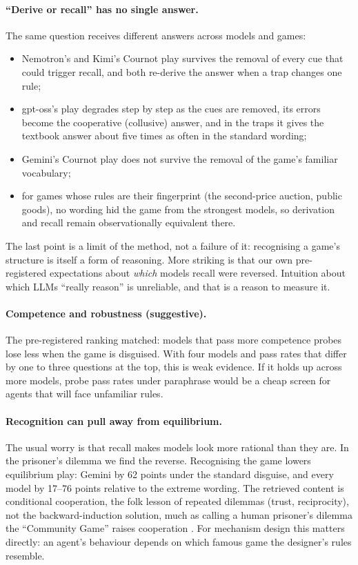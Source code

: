 \documentclass[10pt]{article}
\theoremstyle{definition}
\theoremstyle{remark}
\begin{document}
\paragraph{``Derive or recall'' has no single answer.} The same question receives different
answers across models and games:
\begin{itemize}
\item Nemotron's and Kimi's Cournot play survives the removal of every cue that could trigger
  recall, and both re-derive the answer when a trap changes one rule;
\item gpt-oss's play degrades step by step as the cues are removed, its errors become the
  cooperative (collusive) answer, and in the traps it gives the textbook answer about five
  times as often in the standard wording;
\item Gemini's Cournot play does not survive the removal of the game's familiar vocabulary;
\item for games whose rules are their fingerprint (the second-price auction, public goods), no
  wording hid the game from the strongest models, so derivation and recall remain observationally
  equivalent there.
\end{itemize}
The last point is a limit of the method, not a failure of it: recognising a game's structure is
itself a form of reasoning. More striking is that our own pre-registered expectations
about \emph{which} models recall were reversed. Intuition about which LLMs ``really reason'' is
unreliable, and that is a reason to measure it.

\paragraph{Competence and robustness (suggestive).} The pre-registered ranking matched: models
that pass more competence probes lose less when the game is disguised. With four models and pass
rates that differ by one to three questions at the top, this is weak evidence. If it holds up
across more models, probe pass rates under paraphrase would be a cheap screen for agents that will
face unfamiliar rules.

\paragraph{Recognition can pull away from equilibrium.} The usual worry is that recall makes
models look more rational than they are. In the prisoner's dilemma we find the reverse.
Recognising the game lowers equilibrium play: Gemini by 62 points under the standard disguise,
and every model by 17--76 points relative to the extreme wording. The retrieved content is conditional cooperation, the folk
lesson of repeated dilemmas (trust, reciprocity), not the backward-induction solution, much as
calling a human prisoner's dilemma the ``Community Game'' raises cooperation
\citep{liberman2004name}. For
mechanism design this matters directly: an agent's behaviour depends on which famous game the
designer's rules resemble.
\end{document}
